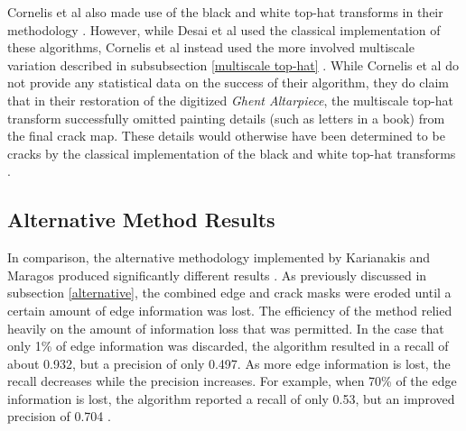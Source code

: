 \documentclass{sig-alternate}
\begin{document}
Cornelis et al also made use of the black and white top-hat transforms in their methodology \cite{Altarpiece:2013}. However, while Desai et al used the classical implementation of these algorithms, Cornelis et al instead used the more involved multiscale variation described in subsubsection \ref{multiscale top-hat} \cite{Altarpiece:2013, Statistics:2013}. While Cornelis et al do not provide any statistical data on the success of their algorithm, they do claim that in their restoration of the digitized \textit{Ghent Altarpiece}, the multiscale top-hat transform successfully omitted painting details (such as letters in a book) from the final crack map. These details would otherwise have been determined to be cracks by the classical implementation of the black and white top-hat transforms \cite{Altarpiece:2013}.

\subsection{Alternative Method Results}\label{alternative results}
In comparison, the alternative methodology implemented by Karianakis and Maragos produced significantly different results \cite{Theran:2013}. As previously discussed in subsection \ref{alternative}, the combined edge and crack masks were eroded until a certain amount of edge information was lost. The efficiency of the method relied heavily on the amount of information loss that was permitted. In the case that only 1\% of edge information was discarded, the algorithm resulted in a recall of about 0.932, but a precision of only 0.497. As more edge information is lost, the recall decreases while the precision increases. For example, when 70\% of the edge information is lost, the algorithm reported a recall of only 0.53, but an improved precision of 0.704 \cite{Theran:2013}.
\end{document}
